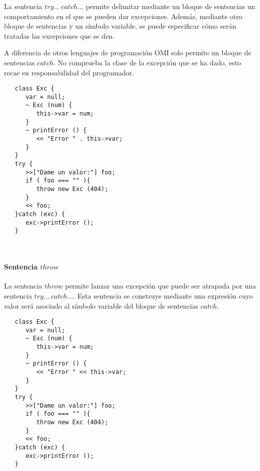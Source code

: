 La sentencia $try...\ catch...$ permite delimitar mediante un bloque de sentencias 
un comportamiento en el que se pueden dar excepciones. Además, mediante otro 
bloque de sentencias y un símbolo variable, se puede especificar cómo serán tratadas
las excepciones que se den.

A diferencia de otros lenguajes de programación OMI solo permite un bloque de 
sentencias $catch$. No comprueba la clase de la excepción que se ha dado, esto recae
en responsabilidad del programador. \\

\begin{lstlisting}
   class Exc {
      var = null;
      ~ Exc (num) {
         this->var = num;
      }
      ~ printError () {
         << "Error " . this->var;
      }
   }
   try {
      >>["Dame un valor:"] foo;
      if ( foo === "" ){
         throw new Exc (404);
      } 
      << foo;
   }catch (exc) {
      exc->printError ();
   }
\end{lstlisting}
\hfill\\



\paragraph{Sentencia $throw$} \label{sec:stmt_throw}

La sentencia $throw$ permite lanzar una excepción que puede ser atrapada por una 
sentencia $try...\ catch...$. Esta sentencia se construye mediante una expresión cuyo 
valor será asociado al símbolo variable del bloque de sentencias $catch$. \\

\begin{lstlisting}
   class Exc {
      var = null;
      ~ Exc (num) {
         this->var = num;
      }
      ~ printError () {
         << "Error " << this->var;
      }
   }
   try {
      >>["Dame un valor:"] foo;
      if ( foo === "" ){
         throw new Exc (404);
      } 
      << foo;
   }catch (exc) {
      exc->printError ();
   }
\end{lstlisting}
\hfill\\

